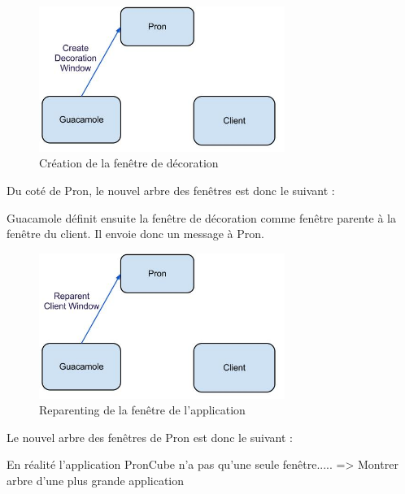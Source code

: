 \begin{figure}[H]
  \centering
  \includegraphics[width=8cm]{images/Guacamole_anim_4.jpg}
  \caption{Création de la fenêtre de décoration}
  \label{fig:guacamole_anim_4}
\end{figure}

Du coté de Pron, le nouvel arbre des fenêtres est donc le suivant :

\begin{center}
\end{center}

Guacamole définit ensuite la fenêtre de décoration comme fenêtre parente à la fenêtre du client.
Il envoie donc un message à Pron.

\begin{figure}[H]
  \centering
  \includegraphics[width=8cm]{images/Guacamole_anim_5.jpg}
  \caption{Reparenting de la fenêtre de l'application}
  \label{fig:guacamole_anim_5}
\end{figure}

Le nouvel arbre des fenêtres de Pron est donc le suivant :

\begin{center}
\end{center}


En réalité l'application PronCube n'a pas qu'une seule fenêtre..... => Montrer arbre d'une plus grande application
